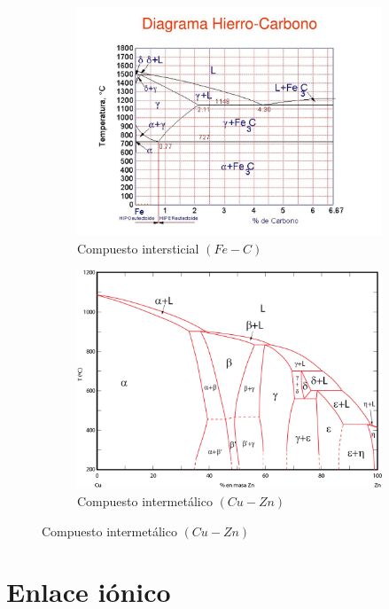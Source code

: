\documentclass[12pt]{article}
\begin{document}
\begin{figure}[h!]
\centering
\begin{subfigure}[b]{0.45\linewidth}
\includegraphics[width=\linewidth]{Diagrama_intersticial}
\caption{Compuesto intersticial $(Fe-C)$}
\label{fig:westminster_lateral}
\end{subfigure}
\begin{subfigure}[b]{0.45\linewidth}
\includegraphics[width=\linewidth]{Diagrama_intermetalico}
\caption{Compuesto intermetálico $(Cu-Zn)$}
\label{fig:westminster_aerea}
\end{subfigure}
\label{fig:westminster}
\end{figure}

\section{Enlace iónico}	
\end{document}
